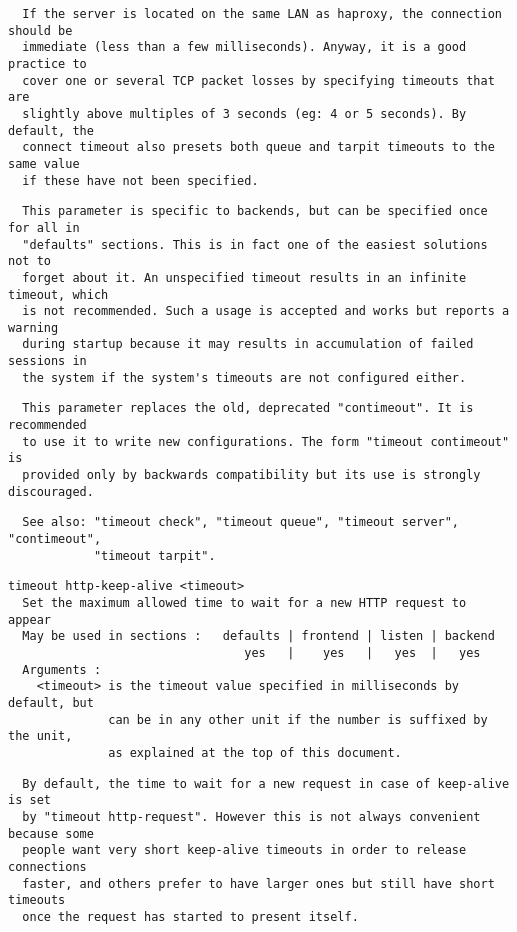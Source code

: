 \begin{verbatim}
  If the server is located on the same LAN as haproxy, the connection should be
  immediate (less than a few milliseconds). Anyway, it is a good practice to
  cover one or several TCP packet losses by specifying timeouts that are
  slightly above multiples of 3 seconds (eg: 4 or 5 seconds). By default, the
  connect timeout also presets both queue and tarpit timeouts to the same value
  if these have not been specified.
\end{verbatim}

\begin{verbatim}
  This parameter is specific to backends, but can be specified once for all in
  "defaults" sections. This is in fact one of the easiest solutions not to
  forget about it. An unspecified timeout results in an infinite timeout, which
  is not recommended. Such a usage is accepted and works but reports a warning
  during startup because it may results in accumulation of failed sessions in
  the system if the system's timeouts are not configured either.
\end{verbatim}

\begin{verbatim}
  This parameter replaces the old, deprecated "contimeout". It is recommended
  to use it to write new configurations. The form "timeout contimeout" is
  provided only by backwards compatibility but its use is strongly discouraged.
\end{verbatim}

\begin{verbatim}
  See also: "timeout check", "timeout queue", "timeout server", "contimeout",
            "timeout tarpit".
\end{verbatim}

\begin{verbatim}
timeout http-keep-alive <timeout>
  Set the maximum allowed time to wait for a new HTTP request to appear
  May be used in sections :   defaults | frontend | listen | backend
                                 yes   |    yes   |   yes  |   yes
  Arguments :
    <timeout> is the timeout value specified in milliseconds by default, but
              can be in any other unit if the number is suffixed by the unit,
              as explained at the top of this document.
\end{verbatim}

\begin{verbatim}
  By default, the time to wait for a new request in case of keep-alive is set
  by "timeout http-request". However this is not always convenient because some
  people want very short keep-alive timeouts in order to release connections
  faster, and others prefer to have larger ones but still have short timeouts
  once the request has started to present itself.
\end{verbatim}

